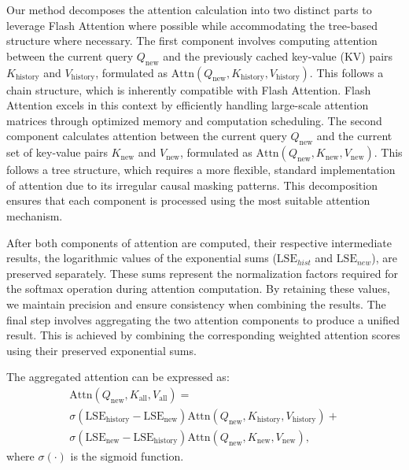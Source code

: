 Our method decomposes the attention calculation into two distinct parts to leverage Flash Attention where possible while accommodating the tree-based structure where necessary. The first component involves computing attention between the current query $Q_{\mathrm{new}}$ and the previously cached key-value (KV) pairs $K_{\mathrm{history}}$ and $V_{\mathrm{history}}$, formulated as $\mathrm{Attn}\left(Q_{\mathrm{new}}, K_{\mathrm{history}}, V_{\mathrm{history}}\right)$. This follows a chain structure, which is inherently compatible with Flash Attention. Flash Attention excels in this context by efficiently handling large-scale attention matrices through optimized memory and computation scheduling. The second component calculates attention between the current query $Q_{\mathrm{new}}$ and the current set of key-value pairs $K_{\mathrm{new}}$ and $V_{\mathrm{new}}$, formulated as $\mathrm{Attn}\left(Q_{\mathrm{new}}, K_{\mathrm{new}}, V_{\mathrm{new}}\right)$. This follows a tree structure, which requires a more flexible, standard implementation of attention due to its irregular causal masking patterns. This decomposition ensures that each component is processed using the most suitable attention mechanism.

After both components of attention are computed, their respective intermediate results, the logarithmic values of the exponential sums ($\mathrm{LSE}_{hist}$ and $\mathrm{LSE}_{new}$), are preserved separately. These sums represent the normalization factors required for the softmax operation during attention computation. By retaining these values, we maintain precision and ensure consistency when combining the results. The final step involves aggregating the two attention components to produce a unified result. This is achieved by combining the corresponding weighted attention scores using their preserved exponential sums. 

\begin{proposition}
    \label{pro:attn_aggr}
    The aggregated attention can be expressed as:
    \begin{multline}
        \mathrm{Attn}\left(Q_{\mathrm{new}}, K_{\mathrm{all}}, V_{\mathrm{all}}\right) = \\
        \sigma\left(\mathrm{LSE}_{\mathrm{history}}-\mathrm{LSE}_{\mathrm{new}}\right)\mathrm{Attn}\left(Q_{\mathrm{new}}, K_{\mathrm{history}}, V_{\mathrm{history}}\right) + \\
         \sigma\left(\mathrm{LSE}_{\mathrm{new}}-\mathrm{LSE}_{\mathrm{history}}\right)\mathrm{Attn}\left(Q_{\mathrm{new}}, K_{\mathrm{new}}, V_{\mathrm{new}}\right),
    \end{multline}
    where $\sigma(\cdot)$ is the sigmoid function.
\end{proposition}

